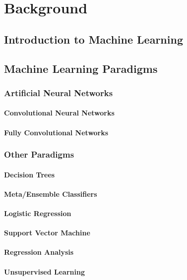 \chapter{Background}
\label{background}

\section{Introduction to Machine Learning}

\section{Machine Learning Paradigms}
\subsection{Artificial Neural Networks}
\subsubsection{Convolutional Neural Networks}
\subsubsection{Fully Convolutional Networks}

\subsection{Other Paradigms}
\subsubsection{Decision Trees}
\subsubsection{Meta/Ensemble Classifiers}
\subsubsection{Logistic Regression}
\subsubsection{Support Vector Machine}
\subsubsection{Regression Analysis}
\subsubsection{Unsupervised Learning}
